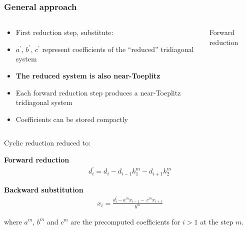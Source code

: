 \begin{frame}
\frametitle{General approach}
\begin{columns}
\begin{column}{0.5\textwidth}
\begin{itemize}
\item {First reduction step, substitute:
    }
\item $a^\prime$, $b^\prime$, $c^\prime$
    represent coefficients of the ``reduced'' tridiagonal system
\item \textbf{The reduced system is also near-Toeplitz}
\item Each forward reduction step produces a near-Toeplitz
    tridiagonal system
\item Coefficients can be stored compactly
\end{itemize}
\end{column}
\begin{column}{0.5\textwidth}
\centering
Forward reduction
\end{column}
\end{columns}
\end{frame}

\begin{frame}
Cyclic reduction reduced to:

\vspace{1cm}

\textbf{Forward reduction}
\begin{align*}
d^{\prime}_i = d_i - d_{i-1}k_1^{m}  - d_{i+1}k_2^{m}
\end{align*}

\textbf{Backward substitution}
\begin{align*}
x_i = \frac{d^{\prime}_i - a^mx_{i-1} - \
    c^{m}x_{i+1}}{b^m}
\end{align*}

where $a^m$, $b^m$ and $c^m$ are the precomputed
coefficients for $i>1$ at the step $m$.
\end{frame}
